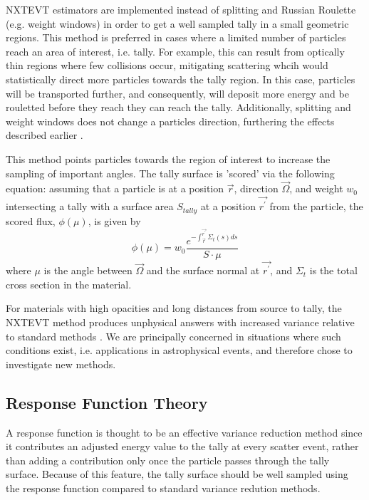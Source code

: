 \documentclass[]{article}
\begin{document}
		NXTEVT estimators are implemented instead of splitting and Russian Roulette (e.g. weight windows) in order to get a well sampled tally in a small geometric regions. This method is preferred in cases where a limited number of particles reach an area of interest, i.e. tally. For example, this can result from optically thin regions where few collisions occur, mitigating scattering whcih would statistically direct more particles towards the tally region. In this case, particles will be transported further, and consequently, will deposit more energy and be rouletted before they reach they can reach the tally. Additionally, splitting and weight windows does not change a particles direction, furthering the effects described earlier \cite{BF12}.
		
		This method points particles towards the region of interest to increase the sampling of important angles. The tally surface is 'scored' via the following equation: assuming that a particle is at a position $\vec{r}$, direction $\vec{\Omega}$, and weight $w_{0}$ intersecting a tally with a surface area $S_{tally}$ at a position $\vec{r^{\prime}}$ from the particle, the scored flux, $\phi(\mu)$, is given by
		\begin{equation}
			\phi(\mu) = w_{0} \frac{e^{-\int_{\vec{r}}^{\vec{r^{\prime}}} \Sigma_{t}(s)ds}}{S \cdot \mu}
		\end{equation}
		where $\mu$ is the angle between $\vec{\Omega}$ and the surface normal at $\vec{r^{\prime}}$, and $\Sigma_{t}$ is the total cross section in the material. 
		
		For materials with high opacities and long distances from source to tally, the NXTEVT method produces unphysical answers with increased variance relative to standard methods \cite{KH86}. We are principally concerned in situations where such conditions exist, i.e. applications in astrophysical events, and therefore chose to investigate new methods. 
		
	\subsection{Response Function Theory}
		A response function is thought to be an effective variance reduction method since it contributes an adjusted energy value to the tally at every scatter event, rather than adding a contribution only once the particle passes through the tally surface. Because of this feature, the tally surface should be well sampled using the response function compared to standard variance redution methods.
\end{document}
